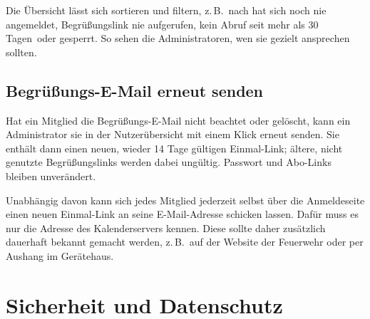 \documentclass[a4paper,fontsize=10pt]{scrartcl}
\begin{document}
Die Übersicht lässt sich sortieren und filtern, z.\,B.\ nach
\glqq hat sich noch nie angemeldet\grqq, \glqq Begrüßungslink nie
aufgerufen\grqq, \glqq kein Abruf seit mehr als 30 Tagen\grqq\ oder
\glqq gesperrt\grqq. So sehen die Administratoren, wen sie gezielt
ansprechen sollten.

\subsection*{Begrüßungs-E-Mail erneut senden}

Hat ein Mitglied die Begrüßungs-E-Mail nicht beachtet oder gelöscht, kann ein
Administrator sie in der Nutzerübersicht mit einem Klick erneut senden. Sie
enthält dann einen neuen, wieder 14 Tage gültigen Einmal-Link; ältere,
nicht genutzte Begrüßungslinks werden dabei ungültig. Passwort und Abo-Links
bleiben unverändert.

Unabhängig davon kann sich jedes Mitglied jederzeit selbst über die
Anmeldeseite einen neuen Einmal-Link an seine E-Mail-Adresse schicken lassen.
Dafür muss es nur die Adresse des Kalenderservers kennen. Diese sollte daher
zusätzlich dauerhaft bekannt gemacht werden, z.\,B.\ auf der Website der
Feuerwehr oder per Aushang im Gerätehaus.

\section{Sicherheit und Datenschutz}
\end{document}
